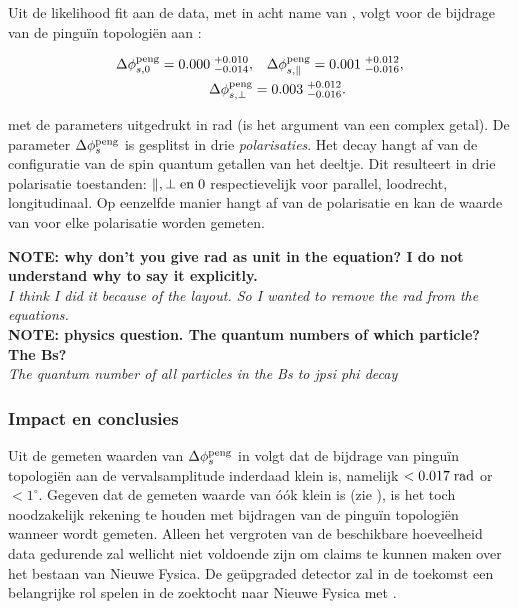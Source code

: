 Uit de likelihood fit aan de data, met in acht name van \cite{Fleischer:1999zi,Faller:2008gt,DeBruyn:2014oga,DeBruyn-thesis}, volgt voor de bijdrage van de pingu\"in topologi\"en aan \phis:


\begin{align}
\label{app_delta_phis_result}
  \Delta\phi^{\rm peng}_{s,{0}}         = 0.000 \; ^{+0.010}_{-0.014}, &\quad  \Delta\phi^{\rm peng}_{s,{\parallel}} = 0.001 \; ^{+0.012}_{-0.016}, \nonumber \\
  \Delta\phi^{\rm peng}_{s,{\perp}}     &= 0.003 \; ^{+0.012}_{-0.016}.
\end{align}


\noindent met de parameters uitgedrukt in rad (\phis is het argument van een complex getal). De parameter $\Delta\phi_{s}^{\tiny\text{peng}}$ is gesplitst in drie {\it polarisaties}. Het decay  \BsJpsiPhi hangt af van de configuratie van de spin quantum getallen van het deeltje. Dit resulteert in drie polarisatie toestanden: $\parallel,\perp {\rm en}\; 0$ respectievelijk voor parallel, loodrecht, longitudinaal. Op eenzelfde manier hangt \phis af van de polarisatie en kan de waarde van \phis voor elke polarisatie worden gemeten.


\textbf{NOTE: why don't you give rad as unit in the equation? I do not understand why to say it explicitly.}\\
{\color{green}\it I think I did it because of the layout. So I wanted to remove the rad from the equations.}\\

\textbf{NOTE: physics question. The quantum numbers of which particle? The Bs?}\\
{\color{green}\it The quantum number of all particles in the Bs to jpsi phi decay}\\

\subsubsection{Impact en conclusies}
Uit de gemeten waarden van $\Delta\phi_{s}^{\tiny\text{peng}}$ in  volgt dat de bijdrage van pingu\"in topologi\"en aan de \BsJpsiPhi vervalsamplitude inderdaad klein is, namelijk  $<0.017 \; {\rm rad}$ or $<1^\circ$. Gegeven dat de gemeten waarde van \phis \'o\'ok klein is (zie ), is het toch noodzakelijk rekening te houden met bijdragen van de pingu\"in topologi\"en wanneer \phis wordt gemeten. Alleen het vergroten van de beschikbare hoeveelheid data gedurende \lhcb \runtwo zal wellicht niet voldoende zijn om claims te kunnen maken over het bestaan van Nieuwe Fysica. De ge\"upgraded \lhcb detector zal in de toekomst een belangrijke rol spelen in de zoektocht naar Nieuwe Fysica met \phis.

